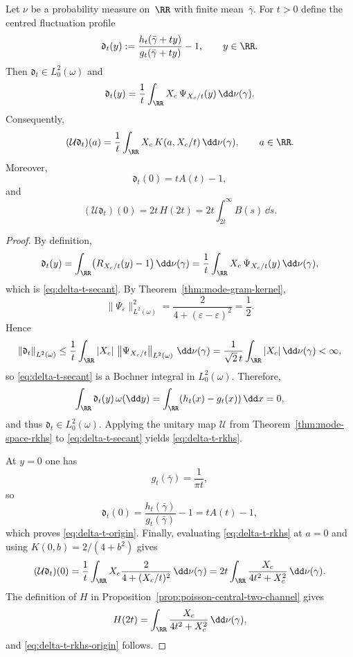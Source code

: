 \begin{theorem}%
\label{thm:poisson-channel-rkhs}
Let $\nu$ be a probability measure on~$\RR$ with finite mean~$\bar{\gamma}$.
For $t>0$ define the centred fluctuation profile
\[
\mathfrak d_t(y):=
\frac{h_t(\bar{\gamma}+ty)}{g_t(\bar{\gamma}+ty)}-1,
\qquad y\in\RR.
\]
Then $\mathfrak d_t\in L^2_0(\omega)$ and
\begin{equation}\label{eq:delta-t-secant}
\mathfrak d_t(y)
=\frac{1}{t}\int_{\RR}X_c\,\Psi_{X_c/t}(y)\,\dd\nu(\gamma).
\end{equation}
Consequently,
\begin{equation}\label{eq:delta-t-rkhs}
(\mathcal U\mathfrak d_t)(a)
=\frac{1}{t}\int_{\RR}X_c\,K(a,X_c/t)\,\dd\nu(\gamma),
\qquad a\in\RR.
\end{equation}
Moreover,
\begin{equation}\label{eq:delta-t-origin}
\mathfrak d_t(0)=tA(t)-1,
\end{equation}
and
\begin{equation}\label{eq:delta-t-rkhs-origin}
(\mathcal U\mathfrak d_t)(0)=2t\,H(2t)
=2t\int_{2t}^{\infty}B(s)\,\dd s.
\end{equation}
\end{theorem}

\begin{proof}
By definition,
\[
\mathfrak d_t(y)
=\int_{\RR}\bigl(R_{X_c/t}(y)-1\bigr)\,\dd\nu(\gamma)
=\frac{1}{t}\int_{\RR}X_c\,\Psi_{X_c/t}(y)\,\dd\nu(\gamma),
\]
which is \eqref{eq:delta-t-secant}.  By Theorem~\ref{thm:mode-gram-kernel},
\[
\|\Psi_\varepsilon\|_{L^2(\omega)}^2
=\frac{2}{4+(\varepsilon-\varepsilon)^2}
=\frac12.
\]
Hence
\[
\left\|\mathfrak d_t\right\|_{L^2(\omega)}
\le\frac{1}{t}\int_{\RR}|X_c|\,\left\|\Psi_{X_c/t}\right\|_{L^2(\omega)}\,\dd\nu(\gamma)
=\frac{1}{\sqrt2\,t}\int_{\RR}|X_c|\,\dd\nu(\gamma)
<\infty,
\]
so \eqref{eq:delta-t-secant} is a Bochner integral in $L^2_0(\omega)$.
Therefore,
\[
\int_{\RR}\mathfrak d_t(y)\,\omega(\dd y)
=\int_{\RR}(h_t(x)-g_t(x))\,\dd x=0,
\]
and thus $\mathfrak d_t\in L^2_0(\omega)$.  Applying the unitary map
$\mathcal U$ from Theorem~\ref{thm:mode-space-rkhs} to
\eqref{eq:delta-t-secant} yields \eqref{eq:delta-t-rkhs}.

At $y=0$ one has
\[
g_t(\bar{\gamma})=\frac{1}{\pi t},
\]
so
\[
\mathfrak d_t(0)
=\frac{h_t(\bar{\gamma})}{g_t(\bar{\gamma})}-1
=tA(t)-1,
\]
which proves \eqref{eq:delta-t-origin}.  Finally, evaluating
\eqref{eq:delta-t-rkhs} at $a=0$ and using
$K(0,b)=2/(4+b^2)$ gives
\[
(\mathcal U\mathfrak d_t)(0)
=\frac{1}{t}\int_{\RR}X_c\frac{2}{4+(X_c/t)^2}\,\dd\nu(\gamma)
=2t\int_{\RR}\frac{X_c}{4t^2+X_c^2}\,\dd\nu(\gamma).
\]
The definition of $H$ in
Proposition~\ref{prop:poisson-central-two-channel} gives
\[
H(2t)=\int_{\RR}\frac{X_c}{4t^2+X_c^2}\,\dd\nu(\gamma),
\]
and \eqref{eq:delta-t-rkhs-origin} follows.
\end{proof}

